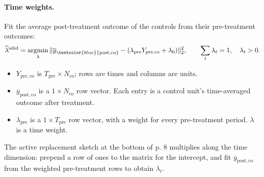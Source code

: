 \paragraph{Time weights.}
Fit the average post-treatment outcome of the controls from their pre-treatment outcomes:
\[
\widehat\lambda^{\mathrm{sdid}}
=\operatorname*{argmin}_{\lambda}
\|\overline y_{\textcolor{blue}{\mathrm{post,co}}}
-(\lambda_{\mathrm{pre}}Y_{\mathrm{pre,co}}+\lambda_0)\|_2^2,
\qquad \sum_t\lambda_t=1,\quad\lambda_t>0.
\]
\begin{itemize}
\item \(Y_{\mathrm{pre,co}}\) is \(T_{\mathrm{pre}}\times N_{\mathrm{co}}\); rows are times and columns are units.
\item \(\overline y_{\mathrm{post,co}}\) is a \(1\times N_{\mathrm{co}}\) row vector. Each entry is a control unit's time-averaged outcome after treatment.
\item \(\lambda_{\mathrm{pre}}\) is a \(1\times T_{\mathrm{pre}}\) row vector, with a weight for every pre-treatment period. \(\lambda\) is a time weight.
\end{itemize}
The active replacement sketch at the bottom of p. 8 multiplies along the time dimension: prepend a row of ones to the matrix for the intercept, and fit \(\overline y_{\mathrm{post,co}}\) from the weighted pre-treatment rows to obtain \(\lambda_t\).
\begin{center}
\end{center}

